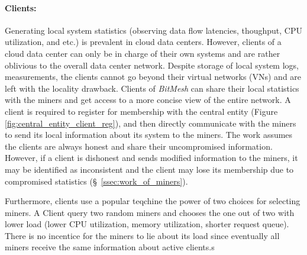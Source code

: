 \documentclass[11px]{article}
\newcommand{\projTitle}{BitMesh\xspace}
\begin{document}
\paragraph{Clients:} Generating local system statistics (observing data flow latencies, thoughput, CPU utilization, and etc.) is prevalent in cloud data centers. However, clients of a cloud data center can only be in charge of their own systems and are rather oblivious to the overall data center network. Despite storage of local system logs, measurements, the clients cannot go beyond their virtual networks (VNs) and are left with the locality drawback. Clients of \textit{\projTitle} can share their local statistics with the miners and get access to a more concise view of the entire network. A client is required to register for membership with the central entity (Figure \ref{fig:central_entity_client_reg}), and then directly communicate with the miners to send its local information about its system to the miners. The work assumes the clients are always honest and share their uncompromised information. However, if a client is dishonest and sends modified information to the miners, it may be identified as inconsistent and the client may lose its membership due to compromised statistics (\S\ \ref{ssec:work_of_miners}).

\noindent \newline Furthermore, clients use a popular teqchine the power of two choices \cite{power_of_two_choices} for selecting  miners. A Client query two random miners and chooses the one out of two with lower load (lower CPU utilization, memory utilization, shorter request queue). There is no incentice for the miners to lie about its load since eventually all miners receive the same information about active clients.s
\par
\end{document}
